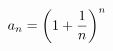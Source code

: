 \documentclass[preview]{standalone}
\begin{document}
\begin{align*}
\special{dvisvgm:raw <g id='unique000'>}a_n=\left(1+\dfrac{1}{n}\right)^n\special{dvisvgm:raw </g>}
\end{align*}
\end{document}
